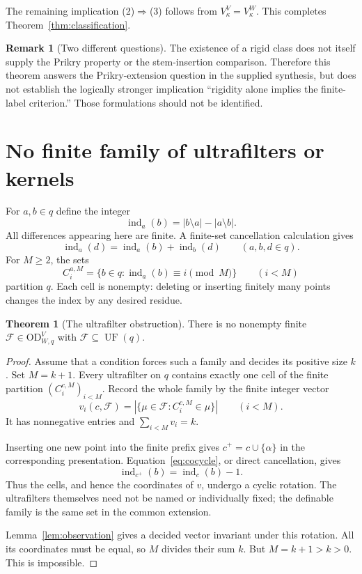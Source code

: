 \documentclass[11pt,letterpaper]{article}
\theoremstyle{definition}
\newtheorem{theorem}[definition]{Theorem}
\newtheorem{remark}[definition]{Remark}
\numberwithin{equation}{section}
\newcommand{\OD}{\mathrm{OD}}
\newcommand{\FF}{\mathcal F}
\newcommand{\UF}{\operatorname{UF}}
\newcommand{\ind}{\operatorname{ind}}
\newcommand{\ODW}{\OD^{V}_{W,q}}
\begin{document}
The remaining implication (2)$\Rightarrow$(3) follows from $V_\kappa^V=V_\kappa^W$. This completes Theorem~\ref{thm:classification}.

\begin{remark}[Two different questions]
The existence of a rigid class does not itself supply the Prikry property or the stem-insertion comparison. Therefore this theorem answers the Prikry-extension question in the supplied synthesis, but does not establish the logically stronger implication ``rigidity alone implies the finite-label criterion.'' Those formulations should not be identified.
\end{remark}

\section{No finite family of ultrafilters or kernels}\label{sec:ultrafilters}

For $a,b\in q$ define the integer
\[
\ind_a(b)=|b\setminus a|-|a\setminus b|.
\]
All differences appearing here are finite. A finite-set cancellation calculation gives
\begin{equation}\label{eq:cocycle}
\ind_a(d)=\ind_a(b)+\ind_b(d)\qquad(a,b,d\in q).
\end{equation}
For $M\geq2$, the sets
\[
C_i^{a,M}=\{b\in q:\ind_a(b)\equiv i\pmod M\}\qquad(i<M)
\]
partition $q$. Each cell is nonempty: deleting or inserting finitely many points changes the index by any desired residue.

\begin{theorem}[The ultrafilter obstruction]\label{thm:ultrafilters}
There is no nonempty finite $\FF\in\ODW$ with $\FF\subseteq\UF(q)$.
\end{theorem}
\begin{proof}
Assume that a condition forces such a family and decides its positive size $k$. Set $M=k+1$. Every ultrafilter on $q$ contains exactly one cell of the finite partition $(C_i^{c,M})_{i<M}$. Record the whole family by the finite integer vector
\[
v_i(c,\FF)=|\{\mu\in\FF:C_i^{c,M}\in\mu\}|\qquad(i<M).
\]
It has nonnegative entries and $\sum_{i<M}v_i=k$.

Inserting one new point into the finite prefix gives $c^+=c\cup\{\alpha\}$ in the corresponding presentation. Equation~\eqref{eq:cocycle}, or direct cancellation, gives
\[
\ind_{c^+}(b)=\ind_c(b)-1.
\]
Thus the cells, and hence the coordinates of $v$, undergo a cyclic rotation. The ultrafilters themselves need not be named or individually fixed; the definable family is the same set in the common extension.

Lemma~\ref{lem:observation} gives a decided vector invariant under this rotation. All its coordinates must be equal, so $M$ divides their sum $k$. But $M=k+1>k>0$. This is impossible.
\end{proof}
\end{document}
